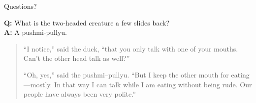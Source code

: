 \documentclass[12pt]{beamer}
\begin{document}
\begin{frame}{Questions?}
  \vspace{4.5cm}

  \footnotesize
  \textbf{Q:} What is the two-headed creature a few slides back?\\
  \textbf{A:} A pushmi-pullyu.

  \begin{quote}
    ``I notice,'' said the duck, ``that you only talk with one of your
    mouths. Can't the other head talk as well?''

    ``Oh, yes,'' said the pushmi--pullyu. ``But I keep the other mouth
    for eating---mostly. In that way I can talk while I am eating
    without being rude. Our people have always been very polite.''
  \end{quote}
\end{frame}
\end{document}
